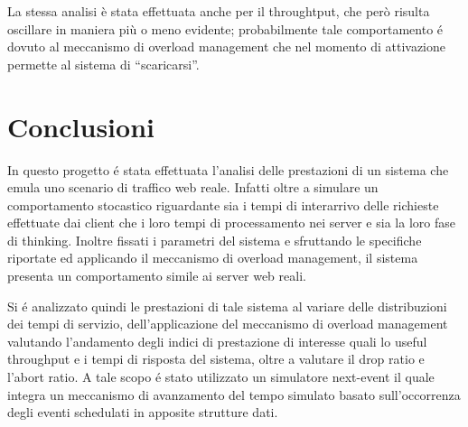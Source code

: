 La stessa analisi è stata effettuata anche per il throughtput, che per\`o risulta oscillare 
in maniera pi\`u o meno evidente; probabilmente tale comportamento \'e dovuto al meccanismo di
overload management che nel momento di attivazione permette al sistema di ``scaricarsi''.


\section{Conclusioni}

In questo progetto \'e stata effettuata l'analisi delle prestazioni di un 
sistema che emula uno scenario di traffico web reale.
Infatti oltre a simulare un comportamento stocastico riguardante sia i tempi di 
interarrivo delle 
richieste effettuate dai client che i loro tempi di processamento nei server e 
sia la loro fase di thinking. Inoltre fissati i parametri del sistema e 
sfruttando le specifiche riportate ed applicando il meccanismo di 
overload management, il sistema presenta un comportamento simile ai server web 
reali. 

Si \'e analizzato quindi le prestazioni di tale sistema al variare delle 
distribuzioni dei tempi di 
servizio, dell'applicazione del meccanismo di overload management valutando 
l'andamento 
degli indici di prestazione di interesse quali lo useful throughput e i tempi di 
risposta del 
sistema, oltre a valutare il drop ratio e l'abort ratio. A tale scopo \'e stato 
utilizzato un 
simulatore next-event il quale integra un meccanismo di avanzamento del tempo 
simulato 
basato sull'occorrenza degli eventi schedulati in apposite strutture dati.